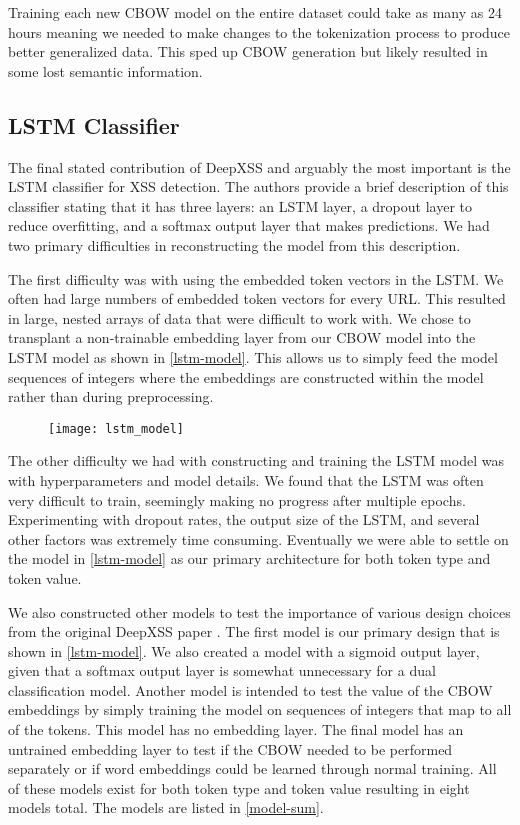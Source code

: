 Training each new CBOW model on the entire dataset could take as many as 24 hours meaning we needed to make changes to the tokenization process to produce better generalized data.  This sped up CBOW generation but likely resulted in some lost semantic information.


\subsection{LSTM Classifier}

The final stated contribution of DeepXSS \cite{fang2018deepxss} and arguably the most important is the LSTM classifier for XSS detection.  The authors provide a brief description of this classifier stating that it has three layers: an LSTM layer, a dropout layer to reduce overfitting, and a softmax output layer that makes predictions.  We had two primary difficulties in reconstructing the model from this description.

The first difficulty was with using the embedded token vectors in the LSTM.  We often had large numbers of embedded token vectors for every URL.  This resulted in large, nested arrays of data that were difficult to work with. We chose to transplant a non-trainable embedding layer from our CBOW model into the LSTM model as shown in \ref{lstm-model}.  This allows us to simply feed the model sequences of integers where the embeddings are constructed within the model rather than during preprocessing.

\begin{figure}[H]
	\texttt{[image: lstm\_model]}
\end{figure} \label{lstm-model}


The other difficulty we had with constructing and training the LSTM model was with hyperparameters and model details. We found that the LSTM was often very difficult to train, seemingly making no progress after multiple epochs.  Experimenting with dropout rates, the output size of the LSTM, and several other factors was extremely time consuming.  Eventually we were able to settle on the model in \ref{lstm-model} as our primary architecture for both token type and token value.

We also constructed other models to test the importance of various design choices from the original DeepXSS paper \cite{fang2018deepxss}.  The first model is our primary design that is shown in \ref{lstm-model}. We also created a model with a sigmoid output layer, given that a softmax output layer is somewhat unnecessary for a dual classification model.  Another model is intended to test the value of the CBOW embeddings by simply training the model on sequences of integers that map to all of the tokens.  This model has no embedding layer.  The final model has an untrained embedding layer to test if the CBOW needed to be performed separately or if word embeddings could be learned through normal training.  All of these models exist for both token type and token value resulting in eight models total.  The models are listed in \ref{model-sum}.



